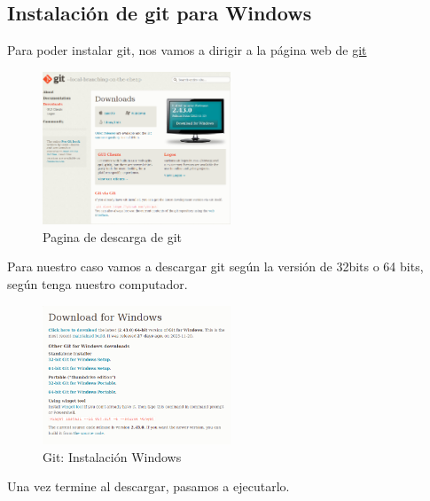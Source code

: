 \subsection{Instalación de git para Windows}
Para poder instalar git, nos vamos a dirigir a la página web de \textcolor{pucpRojo}{\href{https://git-scm.com/downloads}{git}}

\begin{figure}[!h]
	\centering
	\includegraphics[width=0.50\textwidth]{01Instalacion/Imagenes/windows/instalacion01.png}
	\caption{Pagina de descarga de git}
	\label{fig:gitHomepage}
\end{figure}

Para nuestro caso vamos a descargar git según la versión de 32bits o 64 bits, según tenga nuestro computador.

\begin{figure}[!h]
	\centering
	\includegraphics[width=0.50\textwidth]{01Instalacion/Imagenes/windows/instalacion02.png}
	\caption{Git: Instalación Windows}
	\label{fig:git}
\end{figure}

\newpage

Una vez termine al descargar, pasamos a ejecutarlo.

